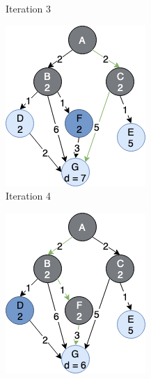 \begin{figure}[h!]
\begin{subfigure}[b]{0.2\linewidth}
    \caption{Iteration 3}
  \end{subfigure}
  \newline
  \begin{subfigure}[b]{0.2\linewidth}
    \includegraphics[width=\linewidth]{images/a_star_expansion4.png}
     \caption{Iteration 4}
  \end{subfigure}
  \hfill
  \begin{subfigure}[b]{0.2\linewidth}
    \includegraphics[width=\linewidth]{images/a_star_expansion5.png}

\end{subfigure}
\end{figure}
